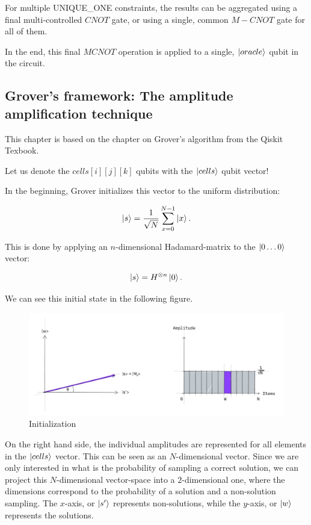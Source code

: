 For multiple UNIQUE\_ONE constraints, the results can be aggregated using a final multi-controlled $CNOT$ gate, or using a single, common $M-CNOT$ gate for all of them.

In the end, this final $MCNOT$ operation is applied to a single, $\ket{oracle}$ qubit in the circuit.

\subsection{Grover's framework: The amplitude amplification technique}

This chapter is based on the chapter on Grover's algorithm from the Qiskit Texbook\cite{GroverQiskitTextbook}.

Let us denote the $cells[i][j][k]$ qubits with the $\ket{cells}$ qubit vector!

In the beginning, Grover initializes this vector to the uniform distribution:

\begin{align*}
\ket{s} = \frac{1}{\sqrt{N}}\sum\limits_{x=0}^{N-1}\ket{x}.
\end{align*}

This is done by applying an $n$-dimensional Hadamard-matrix to the $\ket{0\dots{}0}$ vector:

\begin{align*}
\ket{s} = H^{\otimes{}n}\ket{0}.
\end{align*}

We can see this initial state in the following figure.

\begin{figure}[H]
  \centering
    \includegraphics[width=\linewidth]{content/assets/03_grovers_algorithm/grover_step1.jpg}
    \caption{Initialization}
\end{figure}

On the right hand side, the individual amplitudes are represented for all elements in the $\ket{cells}$ vector. This can be seen as an $N$-dimensional vector. Since we are only interested in what is the probability of sampling a correct solution, we can project this $N$-dimensional vector-space into a $2$-dimensional one, where the dimensions correspond to the probability of a solution and a non-solution sampling. The $x$-axis, or $\ket{s'}$ represents non-solutions, while the $y$-axis, or $\ket{w}$ represents the solutions.

